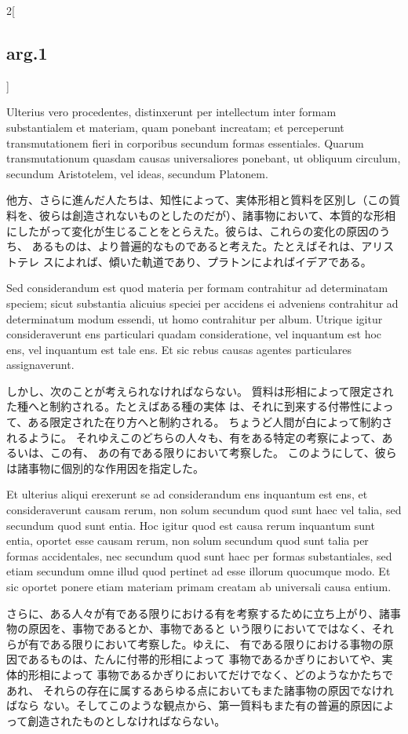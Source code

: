 \documentclass[paper=a4paper,fontsize=10pt,jafontsize=9pt,titlepage]{jlreq}
\begin{document}
\begin{paracol}{2}[\subsection{arg.1}]
\switchcolumn*

Ulterius vero procedentes, distinxerunt per
 intellectum inter formam substantialem et materiam, quam ponebant
 increatam; et perceperunt transmutationem fieri in corporibus secundum
 formas essentiales.
 Quarum transmutationum quasdam causas
 universaliores ponebant, ut obliquum circulum, secundum Aristotelem,
 vel ideas, secundum Platonem.

\switchcolumn

他方、さらに進んだ人たちは、知性によって、実体形相と質料を区別し（この質
料を、彼らは創造されないものとしたのだが）、諸事物において、本質的な形相
にしたがって変化が生じることをとらえた。彼らは、これらの変化の原因のうち、
あるものは、より普遍的なものであると考えた。たとえばそれは、アリストテレ
スによれば、傾いた軌道であり、プラトンによればイデアである。

\switchcolumn*

Sed considerandum est quod materia per
 formam contrahitur ad determinatam speciem; sicut substantia alicuius
 speciei per accidens ei adveniens contrahitur ad determinatum modum
 essendi, ut homo contrahitur per album. Utrique igitur consideraverunt
 ens particulari quadam consideratione, vel inquantum est hoc ens, vel
 inquantum est tale ens. 
Et sic rebus causas agentes particulares
 assignaverunt.

\switchcolumn

しかし、次のことが考えられなければならない。
質料は形相によって限定された種へと制約される。たとえばある種の実体
 は、それに到来する付帯性によって、ある限定された在り方へと制約される。
ちょうど人間が白によって制約されるように。
それゆえこのどちらの人々も、有をある特定の考察によって、あるいは、この有、
 あの有である限りにおいて考察した。
このようにして、彼らは諸事物に個別的な作用因を指定した。

\switchcolumn*

Et ulterius aliqui erexerunt
 se ad considerandum ens
 inquantum est ens, et consideraverunt causam rerum, non solum secundum
 quod sunt haec vel talia, sed secundum quod sunt entia. Hoc igitur quod
 est causa rerum inquantum sunt entia, oportet esse causam rerum, non
 solum secundum quod sunt talia per formas accidentales, nec secundum
 quod sunt haec per formas substantiales, sed etiam secundum omne illud
 quod pertinet ad esse illorum quocumque modo. Et sic oportet ponere
 etiam materiam primam creatam ab universali causa entium.

\switchcolumn

さらに、ある人々が有である限りにおける有を考察するために立ち上がり、諸事
物の原因を、事物であるとか、事物であると
いう限りにおいてではなく、それらが有である限りにおいて考察した。ゆえに、
有である限りにおける事物の原因であるものは、たんに付帯的形相によって
事物であるかぎりにおいてや、実体的形相によって
事物であるかぎりにおいてだけでなく、どのようなかたちであれ、
それらの存在に属するあらゆる点においてもまた諸事物の原因でなければなら
ない。そしてこのような観点から、第一質料もまた有の普遍的原因によって創造されたものとしなければならない。


\end{paracol}
\end{document}
